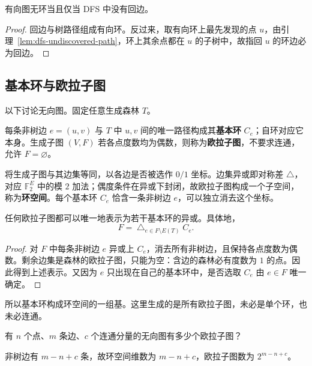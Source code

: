 \begin{corollary}
    有向图无环当且仅当 DFS 中没有回边。
\end{corollary}
\begin{proof}
    回边与树路径组成有向环。反过来，取有向环上最先发现的点 $u$，由引理~\ref{lem:dfs-undiscovered-path}，环上其余点都在 $u$ 的子树中，故指回 $u$ 的环边必为回边。
\end{proof}

\subsection{基本环与欧拉子图}

以下讨论无向图。固定任意生成森林 $T$。

\begin{definition}[基本环与欧拉子图]
    每条非树边 $e=(u,v)$ 与 $T$ 中 $u,v$ 间的唯一路径构成其\textbf{基本环} $C_e$；自环对应它本身。生成子图 $(V,F)$ 若各点度数均为偶数，则称为\textbf{欧拉子图}，不要求连通，允许 $F=\varnothing$。
\end{definition}

将生成子图与其边集等同，以各边是否被选作 $0/1$ 坐标。边集异或即对称差 $\triangle$，对应 $\mathbb F_2^E$ 中的模 $2$ 加法；偶度条件在异或下封闭，故欧拉子图构成一个子空间，称为\textbf{环空间}。每个基本环 $C_e$ 恰含一条非树边 $e$，可以独立消去这个坐标。

\begin{theorem}
    任何欧拉子图都可以唯一地表示为若干基本环的异或。具体地，
    \[
        F=\mathop{\triangle}_{e\in F\setminus E(T)} C_e.
    \]
\end{theorem}
\begin{proof}
    对 $F$ 中每条非树边 $e$ 异或上 $C_e$，消去所有非树边，且保持各点度数为偶数。剩余边集是森林的欧拉子图，只能为空：含边的森林必有度数为 $1$ 的点。因此得到上述表示。又因为 $e$ 只出现在自己的基本环中，是否选取 $C_e$ 由 $e\in F$ 唯一确定。
\end{proof}

所以基本环构成环空间的一组基。这里生成的是所有欧拉子图，未必是单个环，也未必连通。

\begin{exercise}
    有 $n$ 个点、$m$ 条边、$c$ 个连通分量的无向图有多少个欧拉子图？
\end{exercise}
\begin{solution}
    非树边有 $m-n+c$ 条，故环空间维数为 $m-n+c$，欧拉子图数为 $2^{m-n+c}$。
\end{solution}

